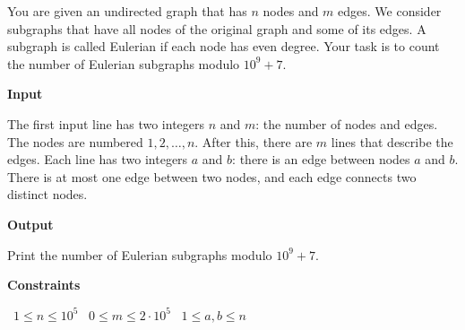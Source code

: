 You are given an undirected graph that has $n$ nodes and $m$ edges.
We consider subgraphs that have all nodes of the original graph and some of its edges. A subgraph is called Eulerian if each node has even degree.
Your task is to count the number of Eulerian subgraphs modulo $10^9+7$.

\vspace{0.3cm}\noindent\textbf{Input}

The first input line has two integers $n$ and $m$: the number of nodes and edges. The nodes are numbered $1,2,\dots,n$.
After this, there are $m$ lines that describe the edges. Each line has two integers $a$ and $b$: there is an edge between nodes $a$ and $b$. There is at most one edge between two nodes, and each edge connects two distinct nodes.

\vspace{0.3cm}\noindent\textbf{Output}

Print the number of Eulerian subgraphs modulo $10^9+7$.

\vspace{0.3cm}\noindent\textbf{Constraints}

\textbullet\ $1 \le n \le 10^5$
\textbullet\ $0 \le m \le 2 \cdot 10^5$
\textbullet\ $1 \le a,b \le n$